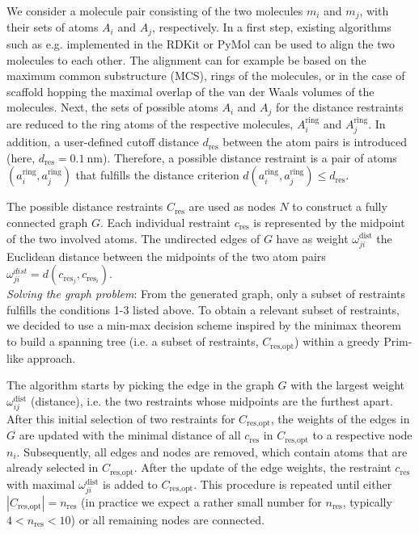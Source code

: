 We consider a molecule pair consisting of the two molecules $m_i$ and $m_j$, with their sets of atoms $A_i$ and $A_j$, respectively. 
In a first step, existing algorithms such as e.g. implemented in the RDKit\cite{Landrum2021} or PyMol\cite{Delano2020} can be used to align the two molecules to each other. The alignment can for example be based on the maximum common substructure (MCS), rings of the molecules, or in the case of scaffold hopping the maximal overlap of the van der Waals volumes of the molecules.
Next, the sets of possible atoms $A_i$ and $A_j$ for the distance restraints are reduced to the ring atoms of the respective molecules, $A^\text{ring}_i$ and $A^\text{ring}_j$. 
In addition, a user-defined cutoff distance $d_\text{res}$ between the atom pairs is introduced (here, $d_\text{res} = 0.1~\text{nm}$). 
Therefore, a possible distance restraint is a pair of atoms $(a^\text{ring}_i, a^\text{ring}_j)$ that fulfills the distance criterion $d(a^\text{ring}_i, a^\text{ring}_j) \leq d_\text{res}$.

The possible distance restraints $C_\text{res}$ are used as nodes $N$ to construct a fully connected graph $G$. 
Each individual restraint $c_\text{res}$ is represented by the midpoint of the two involved atoms.
The undirected edges of $G$ have as weight $\omega^\text{dist}_{ji}$ the Euclidean distance between the midpoints of the two atom pairs $\omega^{dist}_{ji}=d(c_{\text{res}_j},c_{\text{res}_i})$. \\

\noindent\textit{Solving the graph problem}:
From the generated graph, only a subset of restraints fulfills the conditions 1-3 listed above. To obtain a relevant subset of restraints, we decided to use a min-max decision scheme inspired by the minimax theorem \cite{Neumann1928} to build a spanning tree (i.e. a subset of restraints, $C_\text{res,opt}$) within a greedy Prim-like approach.\cite{Prim1957}

The algorithm starts by picking the edge in the graph $G$ with the largest weight $\omega^\text{dist}_{ij}$ (distance), i.e. the two restraints whose midpoints are the furthest apart. 
After this initial selection of two restraints for $C_\text{res,opt}$, the weights of the edges in $G$ are updated with the minimal distance of all $c_\text{res}$ in $C_\text{res,opt}$ to a respective node $n_i$. Subsequently, all edges and nodes are removed, which contain atoms that are already selected in $C_\text{res,opt}$.
After the update of the edge weights, the restraint $c_\text{res}$ with maximal $\omega^\text{dist}_{ji}$ is added to $C_\text{res,opt}$.
This procedure is repeated until either $|C_\text{res,opt}| = n_\text{res}$ (in practice we expect a rather small number for $n_\text{res}$, typically $ 4 < n_\text{res} < 10$) or all remaining nodes are connected. \\

